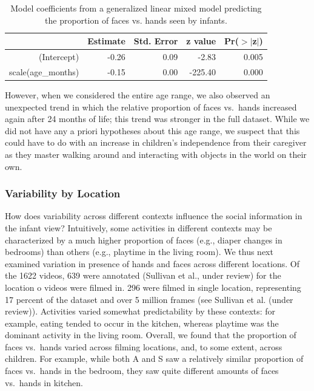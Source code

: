 \documentclass[10pt, letterpaper]{article}
\begin{document}
\begin{table}[ht]
\centering
\begin{tabular}{rrrrr}
  \hline
 & Estimate & Std. Error & z value & Pr($>$$|$z$|$) \\ 
  \hline
(Intercept) & -0.26 & 0.09 & -2.83 & 0.005 \\ 
  scale(age\_months) & -0.15 & 0.00 & -225.40 & 0.000 \\ 
   \hline
\end{tabular}
\caption{Model coefficients from a generalized linear mixed model predicting the proportion of faces vs. hands seen by infants.} 
\end{table}

However, when we considered the entire age range, we also observed an
unexpected trend in which the relative proportion of faces vs.~hands
increased again after 24 months of life; this trend was stronger in the
full dataset. While we did not have any a priori hypotheses about this
age range, we suspect that this could have to do with an increase in
children's independence from their caregiver as they master walking
around and interacting with objects in the world on their own.

\subsubsection{Variability by Location}\label{variability-by-location}

How does variability across different contexts influence the social
information in the infant view? Intuitively, some activities in
different contexts may be characterized by a much higher proportion of
faces (e.g., diaper changes in bedrooms) than others (e.g., playtime in
the living room). We thus next examined variation in presence of hands
and faces across different locations. Of the 1622 videos, 639 were
annotated (Sullivan et al., under review) for the location o videos were
filmed in. 296 were filmed in single location, representing 17 percent
of the dataset and over 5 million frames (see Sullivan et al. (under
review)). Activities varied somewhat predictability by these contexts:
for example, eating tended to occur in the kitchen, whereas playtime was
the dominant activity in the living room. Overall, we found that the
proportion of faces vs.~hands varied across filming locations, and, to
some extent, across children. For example, while both A and S saw a
relatively similar proportion of faces vs.~hands in the bedroom, they
saw quite different amounts of faces vs.~hands in kitchen.
\end{document}
